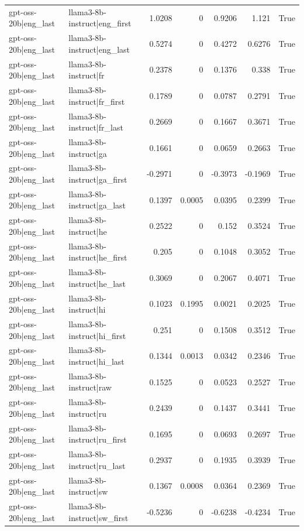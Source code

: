 \begin{table}
\begin{tabular}{l l r r r r l}
gpt-oss-20b|eng_last & llama3-8b-instruct|eng_first & 1.0208 & 0 & 0.9206 & 1.121 & True \\
gpt-oss-20b|eng_last & llama3-8b-instruct|eng_last & 0.5274 & 0 & 0.4272 & 0.6276 & True \\
gpt-oss-20b|eng_last & llama3-8b-instruct|fr & 0.2378 & 0 & 0.1376 & 0.338 & True \\
gpt-oss-20b|eng_last & llama3-8b-instruct|fr_first & 0.1789 & 0 & 0.0787 & 0.2791 & True \\
gpt-oss-20b|eng_last & llama3-8b-instruct|fr_last & 0.2669 & 0 & 0.1667 & 0.3671 & True \\
gpt-oss-20b|eng_last & llama3-8b-instruct|ga & 0.1661 & 0 & 0.0659 & 0.2663 & True \\
gpt-oss-20b|eng_last & llama3-8b-instruct|ga_first & -0.2971 & 0 & -0.3973 & -0.1969 & True \\
gpt-oss-20b|eng_last & llama3-8b-instruct|ga_last & 0.1397 & 0.0005 & 0.0395 & 0.2399 & True \\
gpt-oss-20b|eng_last & llama3-8b-instruct|he & 0.2522 & 0 & 0.152 & 0.3524 & True \\
gpt-oss-20b|eng_last & llama3-8b-instruct|he_first & 0.205 & 0 & 0.1048 & 0.3052 & True \\
gpt-oss-20b|eng_last & llama3-8b-instruct|he_last & 0.3069 & 0 & 0.2067 & 0.4071 & True \\
gpt-oss-20b|eng_last & llama3-8b-instruct|hi & 0.1023 & 0.1995 & 0.0021 & 0.2025 & True \\
gpt-oss-20b|eng_last & llama3-8b-instruct|hi_first & 0.251 & 0 & 0.1508 & 0.3512 & True \\
gpt-oss-20b|eng_last & llama3-8b-instruct|hi_last & 0.1344 & 0.0013 & 0.0342 & 0.2346 & True \\
gpt-oss-20b|eng_last & llama3-8b-instruct|raw & 0.1525 & 0 & 0.0523 & 0.2527 & True \\
gpt-oss-20b|eng_last & llama3-8b-instruct|ru & 0.2439 & 0 & 0.1437 & 0.3441 & True \\
gpt-oss-20b|eng_last & llama3-8b-instruct|ru_first & 0.1695 & 0 & 0.0693 & 0.2697 & True \\
gpt-oss-20b|eng_last & llama3-8b-instruct|ru_last & 0.2937 & 0 & 0.1935 & 0.3939 & True \\
gpt-oss-20b|eng_last & llama3-8b-instruct|sw & 0.1367 & 0.0008 & 0.0364 & 0.2369 & True \\
gpt-oss-20b|eng_last & llama3-8b-instruct|sw_first & -0.5236 & 0 & -0.6238 & -0.4234 & True \\

\end{tabular}
\end{table}
